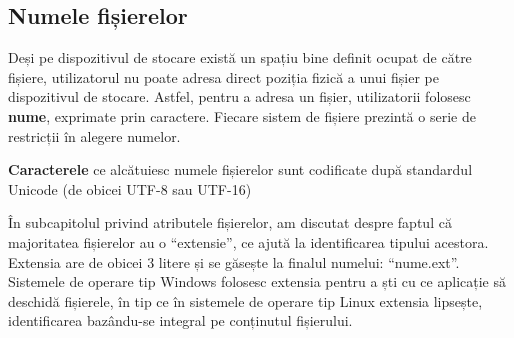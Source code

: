 \subsection{Numele fișierelor}

Deși pe dispozitivul de stocare există un spațiu bine definit ocupat de către
fișiere, utilizatorul nu poate adresa direct poziția fizică a unui fișier pe
dispozitivul de stocare. Astfel, pentru a adresa un fișier, utilizatorii
folosesc \textbf{nume}, exprimate prin caractere. Fiecare sistem de fișiere
prezintă o serie de restricții în alegere numelor.

\textbf{Caracterele} ce alcătuiesc numele fișierelor sunt codificate după
standardul Unicode (de obicei UTF-8 sau UTF-16)

În subcapitolul privind atributele fișierelor, am discutat despre faptul că
majoritatea fișierelor au o “extensie”, ce ajută la identificarea tipului
acestora. Extensia are de obicei 3 litere și se găsește la finalul numelui:
“nume.ext”. Sistemele de operare tip Windows folosesc extensia pentru a ști cu
ce aplicație să deschidă fișierele, în tip ce în sistemele de operare tip Linux
extensia lipsește, identificarea bazându-se integral pe conținutul fișierului.

